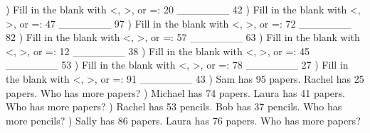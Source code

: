 \documentclass{article}%
\begin{document}
\newline%
) Fill in the blank with <, >, or =: 20 \_\_\_\_\_\_\_ 42%
\newline%
\newline%
) Fill in the blank with <, >, or =: 47 \_\_\_\_\_\_\_ 97%
\newline%
\newline%
) Fill in the blank with <, >, or =: 72 \_\_\_\_\_\_\_ 82%
\newline%
\newline%
) Fill in the blank with <, >, or =: 57 \_\_\_\_\_\_\_ 63%
\newline%
\newline%
) Fill in the blank with <, >, or =: 12 \_\_\_\_\_\_\_ 38%
\newline%
\newline%
) Fill in the blank with <, >, or =: 45 \_\_\_\_\_\_\_ 53%
\newline%
\newline%
) Fill in the blank with <, >, or =: 78 \_\_\_\_\_\_\_ 27%
\newline%
\newline%
) Fill in the blank with <, >, or =: 91 \_\_\_\_\_\_\_ 43%
\newline%
\newline%
) Sam has 95 papers. Rachel has 25 papers. Who has more papers?%
\newline%
\newline%
) Michael has 74 papers. Laura has 41 papers. Who has more papers?%
\newline%
\newline%
) Rachel has 53 pencils. Bob has 37 pencils. Who has more pencils?%
\newline%
\newline%
) Sally has 86 papers. Laura has 76 papers. Who has more papers?%
\newline%
\newline%
\end{document}
